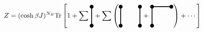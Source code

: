 \documentclass[a4paper,11pt]{jsreport}
\begin{document}
\begin{equation}
  Z = (\cosh{\beta J})^{N_B}\mathrm{Tr}
  \left[
    1 + \sum
    \begin{tikzpicture}[baseline={([yshift=-.5ex]current bounding box.center)}]
      \draw[very thick](0,0)--(0,-1);
      \fill(0,0)circle(0.1);
      \fill(0,-1)circle(0.1);
    \end{tikzpicture}
    + \sum
    \left(
    \begin{tikzpicture}[baseline={([yshift=-.5ex]current bounding box.center)}]
      \draw[very thick](0,0)--(0,-1);
      \draw[very thick](1,0)--(1,-1);
      \fill(0,0)circle(0.1);
      \fill(0,-1)circle(0.1);
      \fill(1,0)circle(0.1);
      \fill(1,-1)circle(0.1);
    \end{tikzpicture} +
    \begin{tikzpicture}[baseline={([yshift=-.5ex]current bounding box.center)}]
      \draw[very thick](0,0)--(0,-1);
      \draw[very thick](0,0)--(1,0);
      \fill(0,0)circle(0.1);
      \fill(0,-1)circle(0.1);
      \fill(1,0)circle(0.1);
    \end{tikzpicture}
    \right) + \cdots
    \right]
\end{equation}
\end{document}
